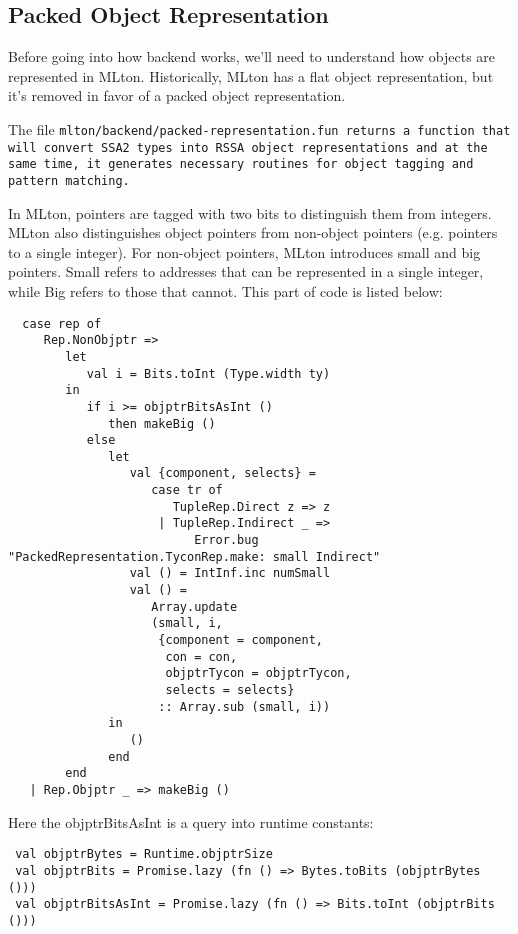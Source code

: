 \subsection{Packed Object Representation}
Before going into how backend works, we'll need to understand how
objects are represented in MLton. Historically, MLton has a flat
object representation, but it's removed in favor of a packed object
representation.

The file \tt{mlton/backend/packed-representation.fun} returns a
function that will convert SSA2 types into RSSA object
representations and at the same time, it generates necessary routines
for object tagging and pattern matching.

In MLton, pointers are tagged with two bits to distinguish them from
integers. MLton also distinguishes object pointers from non-object
pointers (e.g. pointers to a single integer). For non-object pointers,
MLton introduces small and big pointers. Small refers to addresses
that can be represented in a single integer, while Big refers to those
that cannot. This part of code is listed below:

\begin{verbatim}
  case rep of
     Rep.NonObjptr =>
        let
           val i = Bits.toInt (Type.width ty)
        in
           if i >= objptrBitsAsInt ()
              then makeBig ()
           else
              let
                 val {component, selects} =
                    case tr of
                       TupleRep.Direct z => z
                     | TupleRep.Indirect _ =>
                          Error.bug "PackedRepresentation.TyconRep.make: small Indirect"
                 val () = IntInf.inc numSmall
                 val () =
                    Array.update
                    (small, i,
                     {component = component,
                      con = con,
                      objptrTycon = objptrTycon,
                      selects = selects}
                     :: Array.sub (small, i))
              in
                 ()
              end
        end
   | Rep.Objptr _ => makeBig ()
\end{verbatim}

Here the objptrBitsAsInt is a query into runtime constants:

\begin{verbatim}
 val objptrBytes = Runtime.objptrSize
 val objptrBits = Promise.lazy (fn () => Bytes.toBits (objptrBytes ()))
 val objptrBitsAsInt = Promise.lazy (fn () => Bits.toInt (objptrBits ()))
\end{verbatim}

